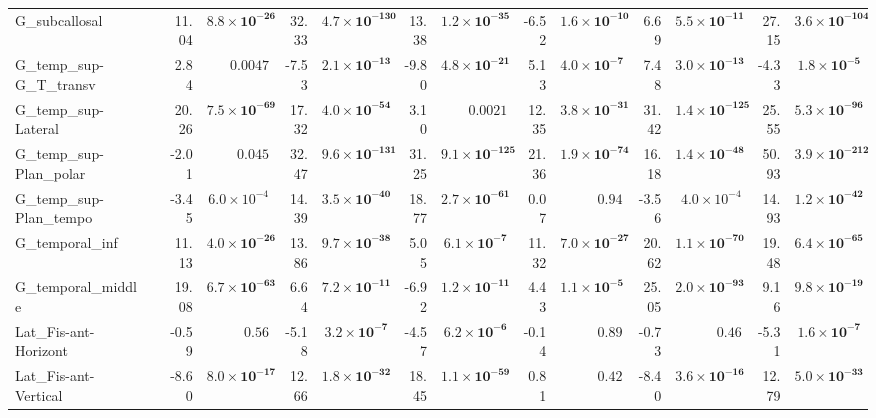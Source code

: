 {\begin{longtable}{llrrrrrrrrrrrr}
G\_subcallosal &  & 11.04 & $\mathbf{8.8{\times}10^{-26}}$ & 32.33 & $\mathbf{4.7{\times}10^{-130}}$ & 13.38 & $\mathbf{1.2{\times}10^{-35}}$ & -6.52 & $\mathbf{1.6{\times}10^{-10}}$ & 6.69 & $\mathbf{5.5{\times}10^{-11}}$ & 27.15 & $\mathbf{3.6{\times}10^{-104}}$ \\
G\_temp\_sup-G\_T\_transv &  & 2.84 & $0.0047$ & -7.53 & $\mathbf{2.1{\times}10^{-13}}$ & -9.80 & $\mathbf{4.8{\times}10^{-21}}$ & 5.13 & $\mathbf{4.0{\times}10^{-7}}$ & 7.48 & $\mathbf{3.0{\times}10^{-13}}$ & -4.33 & $\mathbf{1.8{\times}10^{-5}}$ \\
G\_temp\_sup-Lateral &  & 20.26 & $\mathbf{7.5{\times}10^{-69}}$ & 17.32 & $\mathbf{4.0{\times}10^{-54}}$ & 3.10 & $0.0021$ & 12.35 & $\mathbf{3.8{\times}10^{-31}}$ & 31.42 & $\mathbf{1.4{\times}10^{-125}}$ & 25.55 & $\mathbf{5.3{\times}10^{-96}}$ \\
G\_temp\_sup-Plan\_polar &  & -2.01 & $0.045$ & 32.47 & $\mathbf{9.6{\times}10^{-131}}$ & 31.25 & $\mathbf{9.1{\times}10^{-125}}$ & 21.36 & $\mathbf{1.9{\times}10^{-74}}$ & 16.18 & $\mathbf{1.4{\times}10^{-48}}$ & 50.93 & $\mathbf{3.9{\times}10^{-212}}$ \\
G\_temp\_sup-Plan\_tempo &  & -3.45 & $6.0{\times}10^{-4}$ & 14.39 & $\mathbf{3.5{\times}10^{-40}}$ & 18.77 & $\mathbf{2.7{\times}10^{-61}}$ & 0.07 & $0.94$ & -3.56 & $4.0{\times}10^{-4}$ & 14.93 & $\mathbf{1.2{\times}10^{-42}}$ \\
G\_temporal\_inf &  & 11.13 & $\mathbf{4.0{\times}10^{-26}}$ & 13.86 & $\mathbf{9.7{\times}10^{-38}}$ & 5.05 & $\mathbf{6.1{\times}10^{-7}}$ & 11.32 & $\mathbf{7.0{\times}10^{-27}}$ & 20.62 & $\mathbf{1.1{\times}10^{-70}}$ & 19.48 & $\mathbf{6.4{\times}10^{-65}}$ \\
G\_temporal\_middle &  & 19.08 & $\mathbf{6.7{\times}10^{-63}}$ & 6.64 & $\mathbf{7.2{\times}10^{-11}}$ & -6.92 & $\mathbf{1.2{\times}10^{-11}}$ & 4.43 & $\mathbf{1.1{\times}10^{-5}}$ & 25.05 & $\mathbf{2.0{\times}10^{-93}}$ & 9.16 & $\mathbf{9.8{\times}10^{-19}}$ \\
Lat\_Fis-ant-Horizont &  & -0.59 & $0.56$ & -5.18 & $\mathbf{3.2{\times}10^{-7}}$ & -4.57 & $\mathbf{6.2{\times}10^{-6}}$ & -0.14 & $0.89$ & -0.73 & $0.46$ & -5.31 & $\mathbf{1.6{\times}10^{-7}}$ \\
Lat\_Fis-ant-Vertical &  & -8.60 & $\mathbf{8.0{\times}10^{-17}}$ & 12.66 & $\mathbf{1.8{\times}10^{-32}}$ & 18.45 & $\mathbf{1.1{\times}10^{-59}}$ & 0.81 & $0.42$ & -8.40 & $\mathbf{3.6{\times}10^{-16}}$ & 12.79 & $\mathbf{5.0{\times}10^{-33}}$ \\

\end{longtable}}
